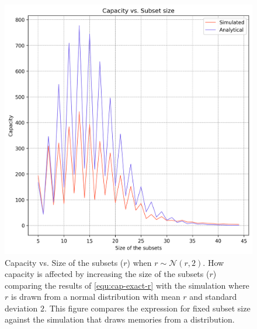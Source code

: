         \begin{figure}%
            \centering
            \includegraphics[scale=0.83]{figures/cap-vs-r-bounded-exact-2.png}
            \caption[Capacity vs. Size of the subsets ($r$) when $r \sim \mathcal{N}(r,2)$]{Capacity vs. Size of the subsets ($r$) when $r \sim \mathcal{N}(r,2)$. \textmd{How capacity is affected by increasing the size of the subsets ($r$) comparing the results of \ref{equ:cap-exact-r} with the simulation where $r$ is drawn from a normal distribution with mean $r$ and standard deviation $2$. This figure compares the expression for fixed subset size against the simulation that draws memories from a distribution.}}
            \label{figure:cap-vs-r-bounded-exact-2}
            \end{figure}

